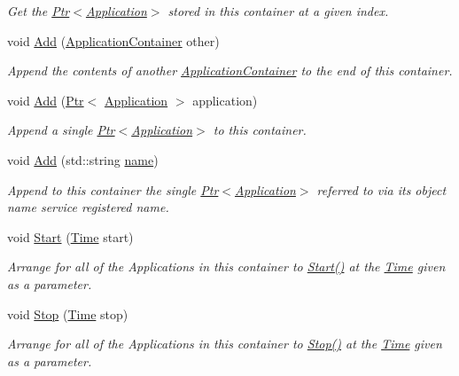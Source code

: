 \begin{DoxyCompactItemize}
\begin{DoxyCompactList}\small\item\em Get the \hyperlink{classns3_1_1Ptr}{Ptr$<$\+Application$>$} stored in this container at a given index. \end{DoxyCompactList}\item 
void \hyperlink{classns3_1_1ApplicationContainer_ad09ab1a1ad5849d518d5f4c262e38152}{Add} (\hyperlink{classns3_1_1ApplicationContainer}{Application\+Container} other)
\begin{DoxyCompactList}\small\item\em Append the contents of another \hyperlink{classns3_1_1ApplicationContainer}{Application\+Container} to the end of this container. \end{DoxyCompactList}\item 
void \hyperlink{classns3_1_1ApplicationContainer_a3acb9bb415105ba7c034b85d5169f858}{Add} (\hyperlink{classns3_1_1Ptr}{Ptr}$<$ \hyperlink{classns3_1_1Application}{Application} $>$ application)
\begin{DoxyCompactList}\small\item\em Append a single \hyperlink{classns3_1_1Ptr}{Ptr$<$\+Application$>$} to this container. \end{DoxyCompactList}\item 
void \hyperlink{classns3_1_1ApplicationContainer_afc05721efc4142518118db91ce1049db}{Add} (std\+::string \hyperlink{generate__test__data__lte__spectrum__model_8m_ab74e6bf80237ddc4109968cedc58c151}{name})
\begin{DoxyCompactList}\small\item\em Append to this container the single \hyperlink{classns3_1_1Ptr}{Ptr$<$\+Application$>$} referred to via its object name service registered name. \end{DoxyCompactList}\item 
void \hyperlink{classns3_1_1ApplicationContainer_a8eff87926507020bbe3e1390358a54a7}{Start} (\hyperlink{classns3_1_1Time}{Time} start)
\begin{DoxyCompactList}\small\item\em Arrange for all of the Applications in this container to \hyperlink{classns3_1_1ApplicationContainer_a8eff87926507020bbe3e1390358a54a7}{Start()} at the \hyperlink{classns3_1_1Time}{Time} given as a parameter. \end{DoxyCompactList}\item 
void \hyperlink{classns3_1_1ApplicationContainer_adfc52f9aa4020c8714679b00bbb9ddb3}{Stop} (\hyperlink{classns3_1_1Time}{Time} stop)
\begin{DoxyCompactList}\small\item\em Arrange for all of the Applications in this container to \hyperlink{classns3_1_1ApplicationContainer_adfc52f9aa4020c8714679b00bbb9ddb3}{Stop()} at the \hyperlink{classns3_1_1Time}{Time} given as a parameter. \end{DoxyCompactList}\end{DoxyCompactItemize}
